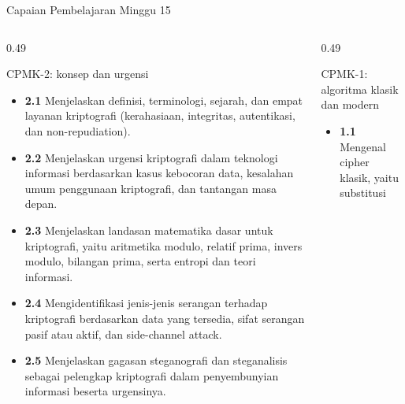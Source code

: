 \documentclass[aspectratio=169,11pt]{beamer}
\begin{document}
\begin{frame}{Capaian Pembelajaran Minggu 15}
    \scriptsize
    \vspace{-0.12cm}
    \begin{columns}[T,onlytextwidth]
        \begin{column}{0.49\textwidth}
            \begin{block}{CPMK-2: konsep dan urgensi}
                \begin{itemize}
                    \setlength{\itemsep}{0pt}
                    \item \textbf{2.1} Menjelaskan definisi, terminologi,
                          sejarah, dan empat layanan kriptografi (kerahasiaan,
                          integritas, autentikasi, dan non-repudiation).
                    \item \textbf{2.2} Menjelaskan urgensi kriptografi dalam
                          teknologi informasi berdasarkan kasus kebocoran data,
                          kesalahan umum penggunaan kriptografi, dan tantangan
                          masa depan.
                    \item \textbf{2.3} Menjelaskan landasan matematika dasar
                          untuk kriptografi, yaitu aritmetika modulo, relatif
                          prima, invers modulo, bilangan prima, serta entropi
                          dan teori informasi.
                    \item \textbf{2.4} Mengidentifikasi jenis-jenis serangan
                          terhadap kriptografi berdasarkan data yang tersedia,
                          sifat serangan pasif atau aktif, dan side-channel
                          attack.
                    \item \textbf{2.5} Menjelaskan gagasan steganografi dan
                          steganalisis sebagai pelengkap kriptografi dalam
                          penyembunyian informasi beserta urgensinya.
                \end{itemize}
            \end{block}
        \end{column}
        \begin{column}{0.49\textwidth}
            \begin{block}{CPMK-1: algoritma klasik dan modern}
                \begin{itemize}
                    \setlength{\itemsep}{0pt}
                    \item \textbf{1.1} Mengenal cipher klasik, yaitu substitusi

\end{itemize}
\end{block}
\end{column}
\end{columns}
\end{frame}
\end{document}
